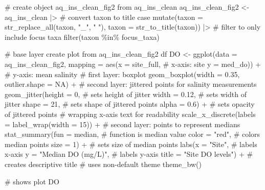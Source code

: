 \documentclass[
  letterpaper,
  DIV=11,
  numbers=noendperiod]{scrartcl}
\newenvironment{Shaded}{\begin{snugshade}}{\end{snugshade}}
\newcommand{\AttributeTok}[1]{\textcolor[rgb]{0.40,0.45,0.13}{#1}}
\newcommand{\CommentTok}[1]{\textcolor[rgb]{0.37,0.37,0.37}{#1}}
\newcommand{\ConstantTok}[1]{\textcolor[rgb]{0.56,0.35,0.01}{#1}}
\newcommand{\DecValTok}[1]{\textcolor[rgb]{0.68,0.00,0.00}{#1}}
\newcommand{\FloatTok}[1]{\textcolor[rgb]{0.68,0.00,0.00}{#1}}
\newcommand{\FunctionTok}[1]{\textcolor[rgb]{0.28,0.35,0.67}{#1}}
\newcommand{\NormalTok}[1]{\textcolor[rgb]{0.00,0.23,0.31}{#1}}
\newcommand{\OtherTok}[1]{\textcolor[rgb]{0.00,0.23,0.31}{#1}}
\newcommand{\SpecialCharTok}[1]{\textcolor[rgb]{0.37,0.37,0.37}{#1}}
\newcommand{\StringTok}[1]{\textcolor[rgb]{0.13,0.47,0.30}{#1}}
\begin{document}
\begin{Shaded}
\begin{Highlighting}[]
\CommentTok{\# create object aq\_ins\_clean\_fig2 from aq\_ins\_clean}
\NormalTok{aq\_ins\_clean\_fig2 }\OtherTok{\textless{}{-}}\NormalTok{  aq\_ins\_clean }\SpecialCharTok{|\textgreater{}}
  \CommentTok{\# convert taxon to title case}
  \FunctionTok{mutate}\NormalTok{(}\AttributeTok{taxon =} \FunctionTok{str\_replace\_all}\NormalTok{(taxon, }\StringTok{"\_"}\NormalTok{, }\StringTok{" "}\NormalTok{), }\AttributeTok{taxon =} \FunctionTok{str\_to\_title}\NormalTok{(taxon)) }\SpecialCharTok{|\textgreater{}} 
  \CommentTok{\# filter to only include focus taxa}
  \FunctionTok{filter}\NormalTok{(taxon }\SpecialCharTok{\%in\%}\NormalTok{ focus\_taxa)}

\CommentTok{\# base layer create plot from aq\_ins\_clean\_fig2 df}
\NormalTok{DO }\OtherTok{\textless{}{-}} \FunctionTok{ggplot}\NormalTok{(}\AttributeTok{data =}\NormalTok{ aq\_ins\_clean\_fig2,}
       \AttributeTok{mapping =} \FunctionTok{aes}\NormalTok{(}\AttributeTok{x =}\NormalTok{ site\_full, }\CommentTok{\# x{-}axis: site}
                     \AttributeTok{y =}\NormalTok{ med\_do)) }\SpecialCharTok{+} \CommentTok{\# y{-}axis: mean salinity}
  \CommentTok{\# first layer: boxplot}
  \FunctionTok{geom\_boxplot}\NormalTok{(}\AttributeTok{width =} \FloatTok{0.35}\NormalTok{, }\AttributeTok{outlier.shape =} \ConstantTok{NA}\NormalTok{) }\SpecialCharTok{+}
  \CommentTok{\# second layer: jittered points for salinity measurements}
  \FunctionTok{geom\_jitter}\NormalTok{(}\AttributeTok{height =} \DecValTok{0}\NormalTok{, }\CommentTok{\# sets height of jitter}
              \AttributeTok{width =} \FloatTok{0.12}\NormalTok{, }\CommentTok{\# sets width of jitter}
              \AttributeTok{shape =} \DecValTok{21}\NormalTok{, }\CommentTok{\# sets shape of jittered points}
              \AttributeTok{alpha =} \FloatTok{0.6}\NormalTok{) }\SpecialCharTok{+} \CommentTok{\# sets opacity of jittered points}
  \CommentTok{\# wrapping x{-}axis text for readability}
  \FunctionTok{scale\_x\_discrete}\NormalTok{(}\AttributeTok{labels =} \FunctionTok{label\_wrap}\NormalTok{(}\AttributeTok{width =} \DecValTok{15}\NormalTok{)) }\SpecialCharTok{+}
  \CommentTok{\# second layer: points to represent medians}
  \FunctionTok{stat\_summary}\NormalTok{(}\AttributeTok{fun =}\NormalTok{ median, }\CommentTok{\# function is median value}
               \AttributeTok{color =} \StringTok{"red"}\NormalTok{, }\CommentTok{\# colors median points}
               \AttributeTok{size =} \DecValTok{1}\NormalTok{) }\SpecialCharTok{+} \CommentTok{\# sets size of median points}
  \FunctionTok{labs}\NormalTok{(}\AttributeTok{x =} \StringTok{"Site"}\NormalTok{, }\CommentTok{\# labels x{-}axis}
       \AttributeTok{y =} \StringTok{"Median DO (mg/L)"}\NormalTok{, }\CommentTok{\# labels y{-}axis}
       \AttributeTok{title =} \StringTok{"Site DO levels"}\NormalTok{) }\SpecialCharTok{+} \CommentTok{\# creates descriptive title}
  \CommentTok{\# uses non{-}default theme}
  \FunctionTok{theme\_bw}\NormalTok{()}

\CommentTok{\# shows plot}
\NormalTok{DO}
\end{Highlighting}
\end{Shaded}
\end{document}
